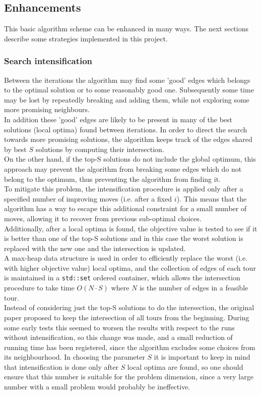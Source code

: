 \subsection{Enhancements}
This basic algorithm scheme can be enhanced in many ways. The next sections describe some strategies implemented in this project.

\subsubsection{Search intensification}
\label{sssec:intensification}
Between the iterations the algorithm may find some 'good' edges which belongs to the optimal solution or to some reasonably good one. Subsequently some time may be lost by repeatedly breaking and adding them, while not exploring some more promising neighbours. \\
In addition these 'good' edges are likely to be present in many of the best solutions (local optima) found between iterations. In order to direct the search towards more promising solutions, the algorithm keeps track of the edges shared by best $S$ solutions by computing their intersection.\\ 
On the other hand, if the top-S solutions do not include the global optimum, this approach  may prevent the algorithm from breaking some edges which do not belong to the optimum, thus preventing the algorithm from finding it.\\ To mitigate this problem, the intensification procedure is applied only after a specified number of improving moves (i.e. after a fixed $i$). This means that the algorithm has a way to escape this additional constraint for a small number of moves, allowing it to recover from previous sub-optimal choices.\\ 
Additionally, after a local optima is found, the objective value is tested to see if it is better than one of the top-S solutions and in this case the worst solution is replaced with the new one and the intersection is updated.\\
A max-heap data structure is used in order to efficiently replace the worst (i.e. with higher objective value) local optima, and the collection of edges of each tour is maintained in a \texttt{std::set} ordered container, which allows the intersection procedure to take time $O(N\cdot S)$ where $N$ is the number of edges in a feasible tour.\\
Instead of considering just the top-S solutions to do the intersection, the original paper proposed to keep the intersection of all tours from the beginning. During some early tests this seemed to worsen the results with respect to the runs without intensification, so this change was made, and a small reduction of running time has been registered, since the algorithm excludes some choices from its neighbourhood.
In choosing the parameter $S$ it is important to keep in mind that intensification is done only after $S$ local optima are found, so one should ensure that this number is suitable for the problem dimension, since a very large number with a small problem would probably be ineffective.

